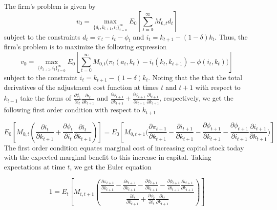 \documentclass[12pt,letter]{article}
\begin{document}
The firm's problem is given by 
\begin{equation*}
	v_0 = \max_{\{d_t, k_{t+1}, i_t\}_{t=0}^\infty} E_0\left[\sum_{t=0}^{\infty}M_{0, t}d_t\right]
\end{equation*}
subject to the constraints $d_t = \pi_t - i_t - \phi_t$ and $i_t = k_{t+1} - (1- \delta)k_t$.  Thus, the firm's problem is to maximize the following expression
\begin{equation*}
		v_0 = \max_{\{k_{t+1}, i_t\}_{t=0}^\infty}E_0\left[\sum_{t=0}^{\infty}M_{0, t}\bigg(\pi_t(a_t, k_t) -i_t(k_t, k_{t+1}) - \phi(i_t, k_t)\bigg)\right]
\end{equation*}
subject to the constraint $i_t = k_{t+1} - (1- \delta)k_t$. Noting that the that the total derivatives of the adjustment cost function at times $t$ and $t+1$ with respect to $k_{t+1}$ take the forms of $\frac{\partial \phi_t}{\partial i_t}\frac{\partial i_t}{\partial k_{t+1}}$ and $ \frac{\partial \phi_{t+1}}{\partial k_{t+1}} + \frac{\partial \phi_{t+1}}{\partial i_{t+1}}\frac{\partial i_{t+1}}{\partial k_{t+1}}$, respectively, we get the following first order condition with respect to $k_{t+1}$

\begin{equation*}
	E_0\left[M_{0, t} \left(\frac{\partial i_t}{\partial k_{t+1}} + \frac{\partial \phi_t}{\partial i_t}\frac{\partial i_t}{\partial k_{t+1}}\right)\right] = E_0\left[M_{0, t+1}\bigg(\frac{\partial \pi_{t+1}}{\partial k_{t+1}} -\frac{\partial i_{t+1}}{\partial k_{t+1}} - \frac{\partial \phi_{t+1}}{\partial k_{t+1}} - \frac{\partial \phi_{t+1}}{\partial i_{t+1}}\frac{\partial i_{t+1}}{\partial k_{t+1}}\bigg)\right]
\end{equation*}
The first order condition equates marginal cost of increasing capital stock today with the expected marginal benefit to this increase in capital. Taking expectations at time $t$, we get the Euler equation 

\begin{equation*}
	1 = E_t \left[M_{t, t+1}\left(\frac{\frac{\partial \pi_{t+1}}{\partial k_{t+1}} -\frac{\partial i_{t+1}}{\partial k_{t+1}} - \frac{\partial \phi_{t+1}}{\partial k_{t+1}} - \frac{\partial \phi_{t+1}}{\partial i_{t+1}}\frac{\partial i_{t+1}}{\partial k_{t+1}}}{\frac{\partial i_t}{\partial k_{t+1}} + \frac{\partial \phi_t}{\partial i_t}\frac{\partial i_t}{\partial k_{t+1}}}\right)\right]
\end{equation*}
\end{document}
